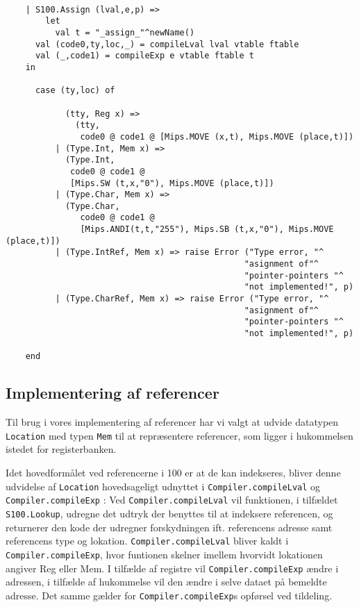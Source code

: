 \documentclass[10pt,a4paper,danish]{article}
\begin{document}
\begin{verbatim}

    | S100.Assign (lval,e,p) =>
        let
          val t = "_assign_"^newName()
	  val (code0,ty,loc,_) = compileLval lval vtable ftable
	  val (_,code1) = compileExp e vtable ftable t
	in
          
	  case (ty,loc) of

            (tty, Reg x) =>
              (tty,
               code0 @ code1 @ [Mips.MOVE (x,t), Mips.MOVE (place,t)])
          | (Type.Int, Mem x) =>
            (Type.Int,
             code0 @ code1 @
             [Mips.SW (t,x,"0"), Mips.MOVE (place,t)])
          | (Type.Char, Mem x) =>
            (Type.Char,
               code0 @ code1 @
               [Mips.ANDI(t,t,"255"), Mips.SB (t,x,"0"), Mips.MOVE (place,t)])
          | (Type.IntRef, Mem x) => raise Error ("Type error, "^
                                                "asignment of"^
                                                "pointer-pointers "^
                                                "not implemented!", p)
          | (Type.CharRef, Mem x) => raise Error ("Type error, "^
                                                "asignment of"^
                                                "pointer-pointers "^
                                                "not implemented!", p)

	end

\end{verbatim}

\subsection{Implementering af referencer}
Til brug i vores implementering af referencer har vi valgt at
udvide datatypen \texttt{Location} med typen \texttt{Mem} til at
repræsentere referencer, som ligger i hukommelsen istedet for
registerbanken. 

Idet hovedformålet ved referencerne i 100 er at de kan indekseres, 
bliver denne udvidelse af \texttt{Location} hovedsageligt udnyttet 
i \texttt{Compiler.compileLval} og \texttt{Compiler.compileExp}
: Ved \texttt{Compiler.compileLval} vil funktionen, i tilfældet
 \texttt{S100.Lookup}, 
udregne det udtryk der benyttes til at indeksere referencen, 
og returnerer den kode der udregner forskydningen ift. referencens 
adresse samt referencens type og lokation. \texttt{Compiler.compileLval}
bliver kaldt i \texttt{Compiler.compileExp}, hvor funtionen skelner 
imellem hvorvidt lokationen angiver Reg eller Mem. I tilfælde af 
registre vil \texttt{Compiler.compileExp} ændre i adressen, 
i tilfælde af hukommelse vil den ændre i selve dataet på bemeldte
adresse. Det samme gælder for \texttt{Compiler.compileExp}s opførsel ved
tildeling.
\end{document}
